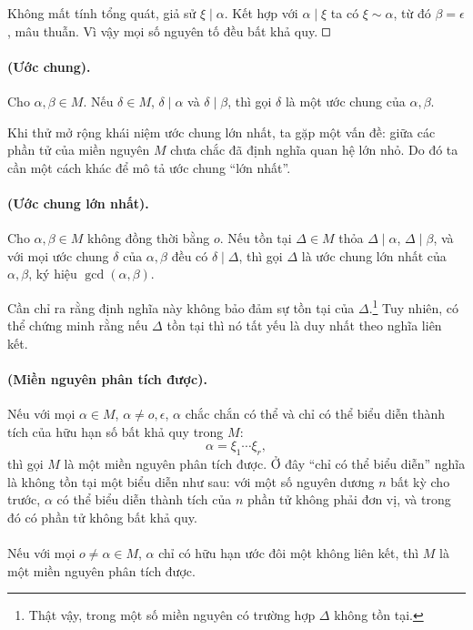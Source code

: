 \documentclass[11pt]{article}
\newcommand{\square}{\mathord{\vcenter{\hrule height .5pt
  \hbox{\vrule width .5pt height 5pt\kern5pt\vrule width .5pt}
  \hrule height .5pt}}}
\begin{document}
Không mất tính tổng quát, giả sử \(\xi\mid\alpha\). Kết hợp với
\(\alpha\mid\xi\) ta có \(\xi\sim\alpha\), từ đó \(\beta=\epsilon\), mâu
thuẫn. Vì vậy mọi số nguyên tố đều bất khả quy. \(\square\)

\paragraph{ (Ước chung).}
Cho \(\alpha,\beta\in M\). Nếu \(\delta\in M\), \(\delta\mid\alpha\) và
\(\delta\mid\beta\), thì gọi \(\delta\) là một ước chung của
\(\alpha,\beta\).

Khi thử mở rộng khái niệm ước chung lớn nhất, ta gặp một vấn đề: giữa các
phần tử của miền nguyên \(M\) chưa chắc đã định nghĩa quan hệ lớn nhỏ. Do đó
ta cần một cách khác để mô tả ước chung ``lớn nhất''.

\paragraph{ (Ước chung lớn nhất).}
Cho \(\alpha,\beta\in M\) không đồng thời bằng \(o\). Nếu tồn tại
\(\Delta\in M\) thỏa \(\Delta\mid\alpha\), \(\Delta\mid\beta\), và với mọi
ước chung \(\delta\) của \(\alpha,\beta\) đều có \(\delta\mid\Delta\), thì gọi
\(\Delta\) là ước chung lớn nhất của \(\alpha,\beta\), ký hiệu
\(\gcd(\alpha,\beta)\).

Cần chỉ ra rằng định nghĩa này không bảo đảm sự tồn tại của
\(\Delta\).\footnote{Thật vậy, trong một số miền nguyên có trường hợp
\(\Delta\) không tồn tại.} Tuy nhiên, có thể chứng minh rằng nếu
\(\Delta\) tồn tại thì nó tất yếu là duy nhất theo nghĩa liên kết.

\paragraph{ (Miền nguyên phân tích được).}
Nếu với mọi \(\alpha\in M\), \(\alpha\ne o,\epsilon\), \(\alpha\) chắc chắn
có thể và chỉ có thể biểu diễn thành tích của hữu hạn số bất khả quy trong
\(M\):
\[
  \alpha=\xi_1\cdots\xi_r,
\tag{20}
\]
thì gọi \(M\) là một miền nguyên phân tích được. Ở đây ``chỉ có thể biểu
diễn'' nghĩa là không tồn tại một biểu diễn như sau: với một số nguyên dương
\(n\) bất kỳ cho trước, \(\alpha\) có thể biểu diễn thành tích của \(n\) phần
tử không phải đơn vị, và trong đó có phần tử không bất khả quy.

\paragraph{}
Nếu với mọi \(o\ne\alpha\in M\), \(\alpha\) chỉ có hữu hạn ước đôi một không
liên kết, thì \(M\) là một miền nguyên phân tích được.
\end{document}

